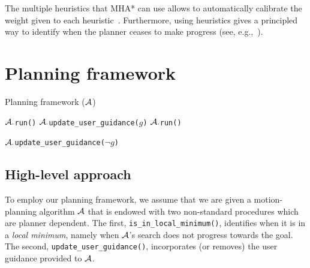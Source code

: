 \documentclass[conference]{IEEEtran}
\begin{document}
%
%



The multiple heuristics that MHA* can use allows to automatically calibrate the weight given to each heuristic~\cite{PNAL15}.
Furthermore, using heuristics gives a principled way to identify when the planner ceases to make progress (see, e.g.,~\cite{VNL17}).

\section{Planning framework}
\label{sec:planning}
\algrenewcommand\algorithmicindent{.8em}
\begin{algorithm}[tb]
\caption{Planning framework ($\mathcal{A}$)}
\label{alg:main}	
\begin{algorithmic}[1]
\small
{} 
		\State $\mathcal{A}.$\texttt{run()}
	\EndWhile
%	
	\State $\mathcal{A}.$\texttt{update\_user\_guidance($g$)}
		\State $\mathcal{A}.$\texttt{run()}
	\EndWhile

	\State $\mathcal{A}.$\texttt{update\_user\_guidance($\neg g$)}
\EndWhile
\end{algorithmic}
\end{algorithm}

\subsection{High-level approach}
\label{sec:high}
To employ our planning framework, we assume that we are given a motion-planning algorithm $\mathcal{A}$ that is endowed with two non-standard procedures which are planner dependent.
The first, \texttt{is\_in\_local\_minimum()}, 
identifies when it is in a \emph{local minimum}, namely when $\mathcal{A}$'s search does not progress towards the goal. 
The second, \texttt{update\_user\_guidance()}, 
incorporates (or removes) the user guidance provided to $\mathcal{A}$. 
\end{document}
